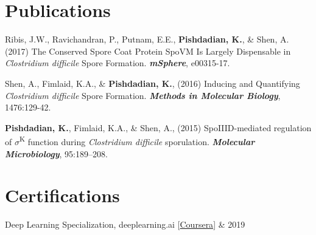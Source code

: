 \documentclass[letterpaper,hidelinks]{scrartcl}
\begin{document}
\section*{Publications}

\begin{list1}
\item Ribis, J.W., Ravichandran, P., Putnam, E.E., \textbf{Pishdadian, K.}, \& Shen, A. (2017) The Conserved Spore Coat Protein SpoVM Is Largely Dispensable in \emph{Clostridium difficile} Spore Formation. \textbf{\emph{mSphere}}, e00315-17.
\item Shen, A., Fimlaid, K.A., \& \textbf{Pishdadian, K.}, (2016) Inducing and Quantifying \emph{Clostridium difficile} Spore Formation. \textbf{\emph{Methods in Molecular Biology}}, 1476:129-42.
\item \textbf{Pishdadian, K.}, Fimlaid, K.A., \& Shen, A., (2015) SpoIIID-mediated regulation of $\sigma$\textsuperscript{K} function during \emph{Clostridium difficile} sporulation. \textbf{\emph{Molecular Microbiology}}, 95:189--208.
\end{list1}

%
%

\section*{Certifications}
\begin{list1}
\item\begin{tabular1bold}Deep Learning Specialization, deeplearning.ai [\href{https://www.coursera.org/account/accomplishments/specialization/MEYXXF6FHDAE}{Coursera}] & 2019\end{tabular1bold}
\end{list1}
\end{document}
